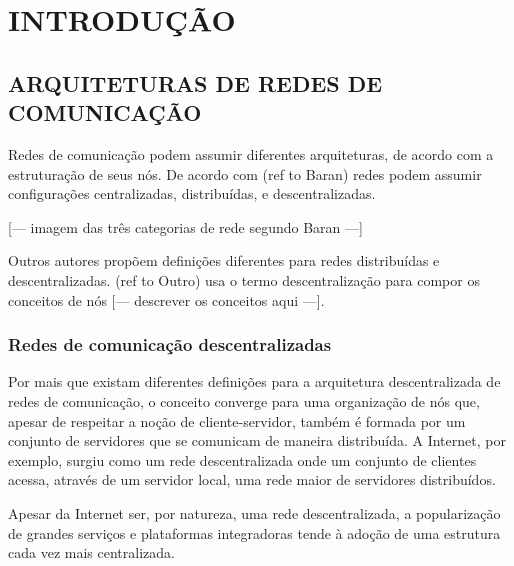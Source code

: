 \chapter{INTRODUÇÃO}


\section{ARQUITETURAS DE REDES DE COMUNICAÇÃO}


Redes de comunicação podem assumir diferentes arquiteturas, de acordo com a 
estruturação de seus nós. De acordo com (ref to Baran) redes podem assumir
configurações centralizadas, distribuídas, e descentralizadas. 

[--- imagem das três categorias de rede segundo Baran ---]

Outros autores propõem definições diferentes para redes distribuídas e
descentralizadas. (ref to Outro) usa o termo descentralização para compor os
conceitos de nós [--- descrever os conceitos aqui ---]. 


\subsection{Redes de comunicação descentralizadas}

Por mais que existam diferentes definições para a arquitetura descentralizada de
redes de comunicação, o conceito converge para uma organização de nós que, apesar
de respeitar a noção de cliente-servidor, também é formada por um conjunto de
servidores que se comunicam de maneira distribuída. A Internet, por exemplo, surgiu
como um rede descentralizada onde um conjunto de clientes acessa, através de um
servidor local, uma rede maior de servidores distribuídos.

Apesar da Internet ser, por natureza, uma rede descentralizada, a popularização de 
grandes serviços e plataformas integradoras tende à adoção de uma estrutura  cada
vez mais centralizada. %




